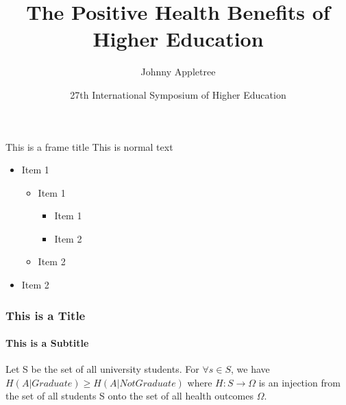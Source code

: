 \documentclass[aspectratio=169]{beamer}
\title{The Positive Health Benefits of Higher Education}
\author[Euclid]{Johnny Appletree }
\institute{University of California, Davis}
\date[ISPN ’80]{27th International Symposium of Higher Education}
\begin{document}
\begin{frame}
\titlepage
\end{frame}

\begin{frame}{This is a frame title}
\label{list}
This is normal text

\begin{itemize}
	\item Item 1
	\begin{itemize}
	\item Item 1
	\begin{itemize}
	\item Item 1
	\item Item 2
\end{itemize}
	\item Item 2
\end{itemize}
	\item Item 2
\end{itemize}
\end{frame}

\begin{frame}
\frametitle{This is a Title}
\framesubtitle{This is a Subtitle}

\begin{theorem}
Let  S be the set of all university students. For $ \forall s \in S$, we have $H(A|Graduate) \geq H(A | Not Graduate)$ where $H: S \rightarrow \Omega$ is an injection from the set of all students S onto the set of all health outcomes $\Omega$.
\end{theorem}

                \hyperlink{list}{}
\end{frame}
\end{document}
